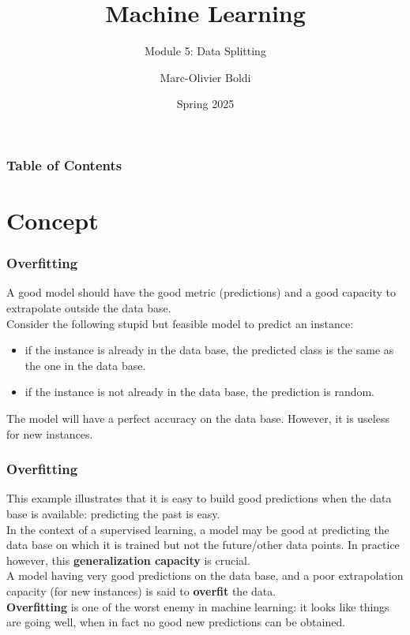 
\title{Machine Learning}
\subtitle{Module 5: Data Splitting}
\author[MOB]{Marc-Olivier Boldi}
\date{Spring 2025}

\begin{frame}
  \titlepage
\end{frame}
\begin{frame}
\frametitle{Table of Contents}
	\tableofcontents
\end{frame}
\section{Concept}
\begin{frame}
\frametitle{Overfitting}
A good model should have the good metric (predictions) and a good capacity to extrapolate outside the data base. \\
\vspace{0.3cm}
Consider the following stupid but feasible model to predict an instance:
\begin{itemize}
\item if the instance is already in the data base, the predicted class is the same as the one in the data base.
\item if the instance is not already in the data base, the prediction is random.
\end{itemize}
The model will have a perfect accuracy on the data base. However, it is useless for new instances.
\end{frame}
\begin{frame}
\frametitle{Overfitting}
This example illustrates that it is easy to build good predictions when the data base is available: predicting the past is easy.\\
\vspace{0.3cm}
In the context of a supervised learning, a model may be good at predicting the data base on which it is trained but not the future/other data points. In practice however, this {\bf generalization capacity} is crucial.\\
\vspace{0.2cm}
A model having very good predictions on the data base, and a poor extrapolation capacity (for new instances) is said to {\bf overfit} the data.\\
\vspace{0.2cm}
{\bf Overfitting} is one of the worst enemy in machine learning: it looks like things are going well, when in fact no good new predictions can be obtained.
\end{frame}
